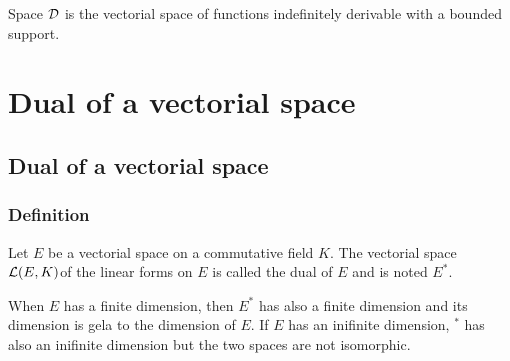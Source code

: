 \documentclass[12pt]{book}
\begin{document}
\begin{defn}
Space ${\cal D}$ is the vectorial space of functions indefinitely derivable
with a bounded support.
\end{defn}


\chapter{Dual of a vectorial space}

\section{Dual of a vectorial space}
\subsection{Definition}
\begin{defn}
Let $E$ be a vectorial space on a commutative field $K$. The vectorial
space ${\cal L}(E,K)$of
the linear forms on $E$ is called the dual of $E$ and is noted $E^*$.
\end{defn}

When $E$ has  a finite dimension, then $E^*$ has also a finite
dimension and its dimension is gela to the dimension of $E$.
If $E$ has an inifinite dimension, $^*$ has also an inifinite
dimension but the two spaces are not isomorphic.
\end{document}
